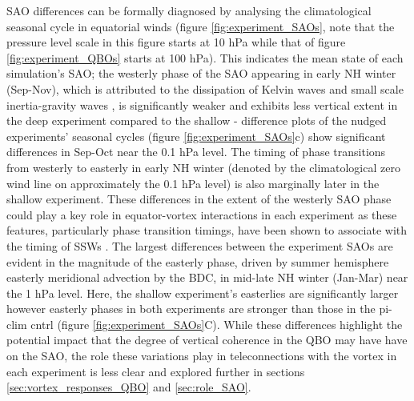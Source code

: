SAO differences can be formally diagnosed by analysing the climatological seasonal cycle in equatorial winds (figure \ref{fig:experiment_SAOs}, note that the pressure level scale in this figure starts at 10 hPa while that of figure \ref{fig:experiment_QBOs} starts at 100 hPa). This indicates the mean state of each simulation's SAO; the westerly phase of the SAO appearing in early NH winter (Sep-Nov), which is attributed to the dissipation of Kelvin waves and small scale inertia-gravity waves \citep{dunkertonRole1979, hitchmanEstimation1988}, is significantly weaker and exhibits less vertical extent in the deep experiment compared to the shallow - difference plots of the nudged experiments' seasonal cycles (figure \ref{fig:experiment_SAOs}c) show significant differences in Sep-Oct near the 0.1 hPa level. The timing of phase transitions from westerly to easterly in early NH winter (denoted by the climatological zero wind line on approximately the 0.1 hPa level) is also marginally later in the shallow experiment. These differences in the extent of the westerly SAO phase could play a key role in equator-vortex interactions in each experiment as these features, particularly phase transition timings, have been shown to associate with the timing of SSWs \citep{grayData2001, hamiltonEffects1998}. The largest differences between the experiment SAOs are evident in the magnitude of the easterly phase, driven by summer hemisphere easterly meridional advection by the BDC, in mid-late NH winter (Jan-Mar) near the 1 hPa level. Here, the shallow experiment's easterlies are significantly larger however easterly phases in both experiments are stronger than those in the pi-clim cntrl (figure \ref{fig:experiment_SAOs}C). While these differences highlight the potential impact that the degree of vertical coherence in the QBO may have have on the SAO, the role these variations play in teleconnections with the vortex in each experiment is less clear and explored further in sections \ref{sec:vortex_responses_QBO} and \ref{sec:role_SAO}.


